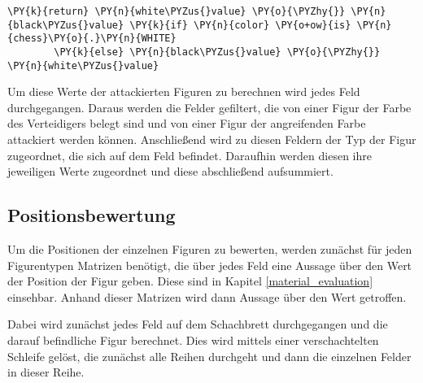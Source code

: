 \begin{Verbatim}[commandchars=\\\{\}]
             \PY{k}{return} \PY{n}{white\PYZus{}value} \PY{o}{\PYZhy{}} \PY{n}{black\PYZus{}value} \PY{k}{if} \PY{n}{color} \PY{o+ow}{is} \PY{n}{chess}\PY{o}{.}\PY{n}{WHITE} 
		\PY{k}{else} \PY{n}{black\PYZus{}value} \PY{o}{\PYZhy{}} \PY{n}{white\PYZus{}value}
\end{Verbatim}

    Um diese Werte der attackierten Figuren zu berechnen wird jedes Feld
durchgegangen. Daraus werden die Felder gefiltert, die von einer Figur
der Farbe des Verteidigers belegt sind und von einer Figur der
angreifenden Farbe attackiert werden können. Anschließend wird zu diesen
Feldern der Typ der Figur zugeordnet, die sich auf dem Feld befindet.
Daraufhin werden diesen ihre jeweiligen Werte zugeordnet und diese
abschließend aufsummiert.

    \subsection{Positionsbewertung}\label{positionsbewertung}

Um die Positionen der einzelnen Figuren zu bewerten, werden zunächst für
jeden Figurentypen Matrizen benötigt, die über jedes Feld eine Aussage
über den Wert der Position der Figur geben. Diese sind in Kapitel \ref{material_evaluation}
einsehbar. Anhand dieser Matrizen wird dann Aussage über den Wert
getroffen.

    Dabei wird zunächst jedes Feld auf dem Schachbrett durchgegangen und die
darauf befindliche Figur berechnet. Dies wird mittels einer
verschachtelten Schleife gelöst, die zunächst alle Reihen durchgeht und
dann die einzelnen Felder in dieser Reihe.

